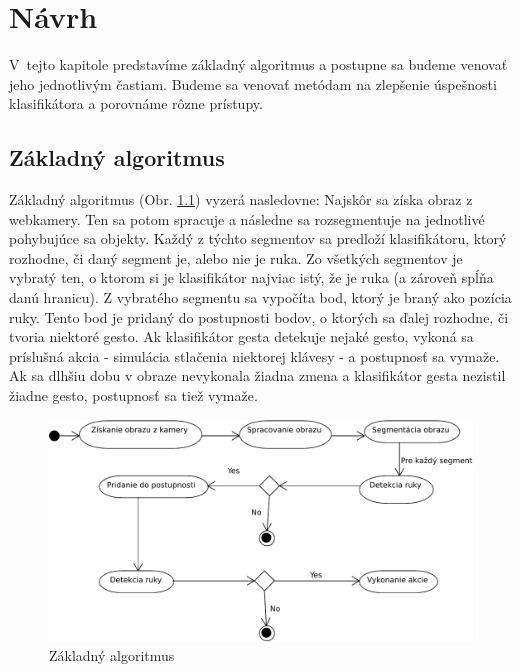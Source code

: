
\chapter{Návrh}\label{chap:design}

V~tejto kapitole predstavíme základný algoritmus a postupne sa budeme venovať jeho jednotlivým častiam. Budeme sa venovať metódam na zlepšenie úspešnosti klasifikátora a porovnáme rôzne prístupy. 
\bigskip

\section{Základný algoritmus}

Základný algoritmus (Obr. \ref{fig:base_alg}) vyzerá nasledovne: 
Najskôr sa získa obraz z webkamery. Ten sa potom spracuje a následne sa rozsegmentuje na jednotlivé pohybujúce sa objekty.
Každý z týchto segmentov sa predloží klasifikátoru, ktorý rozhodne, či daný segment je, alebo nie je ruka. Zo všetkých segmentov je vybratý ten, o ktorom si je klasifikátor najviac istý, že je ruka (a zároveň spĺňa danú hranicu). Z vybratého segmentu sa vypočíta bod, ktorý je braný ako pozícia ruky. Tento bod je pridaný do postupnosti bodov, o ktorých sa ďalej rozhodne, či tvoria niektoré gesto. Ak klasifikátor gesta detekuje nejaké gesto, vykoná sa príslušná akcia - simulácia stlačenia niektorej klávesy - a postupnosť sa vymaže. Ak sa dlhšiu dobu v obraze nevykonala žiadna zmena a klasifikátor gesta nezistil žiadne gesto, postupnosť sa tiež vymaže.

\begin{figure}[htp]
    \centering
    \includegraphics[width=\textwidth]{images/BaseAlgorithm}
    \caption{Základný algoritmus}
    \label{fig:base_alg}
\end{figure}

